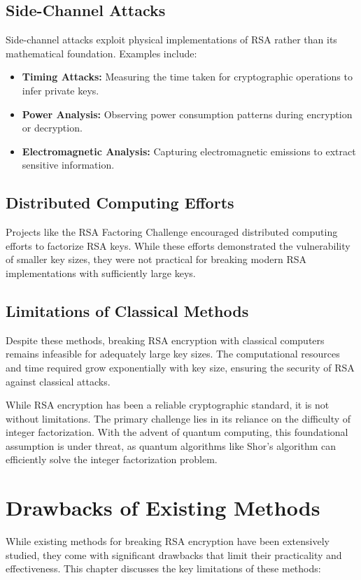 \documentclass[12pt,a4paper]{report}
\begin{document}
\section{Side-Channel Attacks}
Side-channel attacks exploit physical implementations of RSA rather than its mathematical foundation. Examples include:
\begin{itemize}
    \item \textbf{Timing Attacks:} Measuring the time taken for cryptographic operations to infer private keys.
    \item \textbf{Power Analysis:} Observing power consumption patterns during encryption or decryption.
    \item \textbf{Electromagnetic Analysis:} Capturing electromagnetic emissions to extract sensitive information.
\end{itemize}

\section{Distributed Computing Efforts}
Projects like the RSA Factoring Challenge encouraged distributed computing efforts to factorize RSA keys. While these efforts demonstrated the vulnerability of smaller key sizes, they were not practical for breaking modern RSA implementations with sufficiently large keys.

\section{Limitations of Classical Methods}
Despite these methods, breaking RSA encryption with classical computers remains infeasible for adequately large key sizes. The computational resources and time required grow exponentially with key size, ensuring the security of RSA against classical attacks.

While RSA encryption has been a reliable cryptographic standard, it is not without limitations. The primary challenge lies in its reliance on the difficulty of integer factorization. With the advent of quantum computing, this foundational assumption is under threat, as quantum algorithms like Shor's algorithm can efficiently solve the integer factorization problem.

\chapter{Drawbacks of Existing Methods}
While existing methods for breaking RSA encryption have been extensively studied, they come with significant drawbacks that limit their practicality and effectiveness. This chapter discusses the key limitations of these methods:
\end{document}
